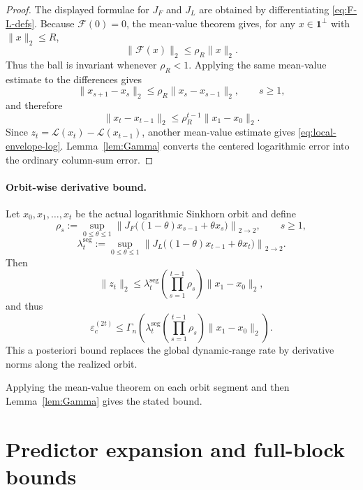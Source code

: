 \documentclass[10pt]{article}
\numberwithin{equation}{section}
\theoremstyle{plain}
\theoremstyle{definition}
\theoremstyle{remark}
\newcommand{\ones}{\mathbf{1}}
\begin{document}
\begin{proof}
The displayed formulae for $J_F$ and $J_L$ are obtained by differentiating \eqref{eq:F-L-defs}. Because $\mathcal F(0)=0$, the mean-value theorem gives, for any $x\in\ones^\perp$ with $\|x\|_2\le R$,
\[
        \|\mathcal F(x)\|_2
        \le
        \rho_R\|x\|_2 .
\]
Thus the ball is invariant whenever $\rho_R<1$. Applying the same mean-value estimate to the differences gives
\[
        \|x_{s+1}-x_s\|_2
        \le
        \rho_R\|x_s-x_{s-1}\|_2,
        \qquad s\ge1,
\]
and therefore
\[
        \|x_t-x_{t-1}\|_2
        \le
        \rho_R^{t-1}\|x_1-x_0\|_2 .
\]
Since $z_t=\mathcal L(x_t)-\mathcal L(x_{t-1})$, another mean-value estimate gives \eqref{eq:local-envelope-log}. Lemma~\ref{lem:Gamma} converts the centered logarithmic error into the ordinary column-sum error.
\end{proof}

\paragraph{Orbit-wise derivative bound.}
Let $x_0,x_1,\dots,x_t$ be the actual logarithmic Sinkhorn orbit and define
\[
        \rho_s
        :=
        \sup_{0\le\theta\le1}
        \left\|
        J_F\big((1-\theta)x_{s-1}+\theta x_s\big)
        \right\|_{2\to2},
        \qquad s\ge1,
\]
\[
        \lambda_t^{\mathrm{seg}}
        :=
        \sup_{0\le\theta\le1}
        \left\|
        J_L\big((1-\theta)x_{t-1}+\theta x_t\big)
        \right\|_{2\to2}.
\]
Then
\begin{equation}\label{eq:orbitwise-log-cert}
        \|z_t\|_2
        \le
        \lambda_t^{\mathrm{seg}}
        \left(\prod_{s=1}^{t-1}\rho_s\right)
        \|x_1-x_0\|_2,
\end{equation}
and thus
\begin{equation}\label{eq:orbitwise-eps-cert}
        \varepsilon_c^{(2t)}
        \le
        \Gamma_n\!\left(
        \lambda_t^{\mathrm{seg}}
        \left(\prod_{s=1}^{t-1}\rho_s\right)
        \|x_1-x_0\|_2
        \right).
\end{equation}
This a posteriori bound replaces the global dynamic-range rate by derivative norms along the realized orbit.

Applying the mean-value theorem on each orbit segment and then Lemma~\ref{lem:Gamma} gives the stated bound.

\section{Predictor expansion and full-block bounds}\label{app:predictor-jacobian}
\end{document}
